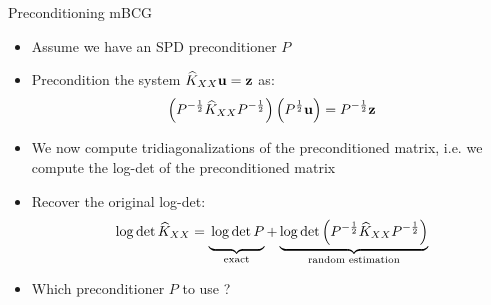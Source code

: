 \documentclass{beamer}
\begin{document}
\begin{frame}{Preconditioning mBCG}
\begin{itemize}[<+->]
    \item Assume we have an SPD preconditioner $P$
    \item Precondition the system $\widehat K_{XX} \boldsymbol{\mathbf{u}} = \boldsymbol{\mathbf{z}}$ as:
    \begin{equation*}
        \left( P^{-\frac 1 2} \widehat K_{XX} P^{-\frac 1 2} \right) \left( P^{\frac 1 2} \boldsymbol{\mathbf{u}}\right) = P^{-\frac 1 2} \boldsymbol{\mathbf{z}}
    \end{equation*}
    \item We now compute tridiagonalizations of the preconditioned matrix, i.e. we compute the log-det of the preconditioned matrix
    \item Recover the original log-det:
    \begin{equation*}
        \log\det \widehat K_{XX} = 
        \underbrace{ 
            \vphantom{\left(P^{-\frac 1 2}  \right)} 
            \log \det P
        }_{\text{exact}} 
        + \underbrace{ 
            \log \det \left(P^{-\frac 1 2} \widehat K_{XX} P^{-\frac 1 2} \right)
        }_{\text{random estimation}}
    \end{equation*}
    \item Which preconditioner $P$ to use ?
\end{itemize}
\end{frame}
\end{document}
